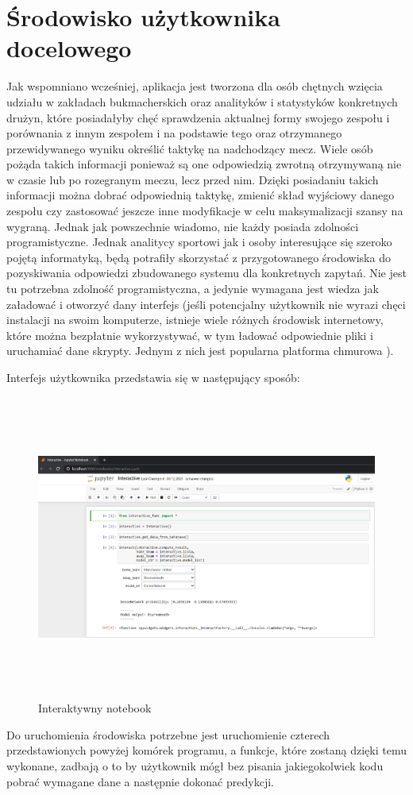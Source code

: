 \section{Środowisko użytkownika docelowego}
\noindent
Jak wspomniano wcześniej, aplikacja jest tworzona dla osób chętnych wzięcia udziału w zakładach bukmacherskich oraz analityków i statystyków konkretnych drużyn, które posiadałyby chęć sprawdzenia aktualnej formy swojego zespołu i porównania z innym zespołem i na podstawie tego oraz otrzymanego przewidywanego wyniku określić taktykę na nadchodzący mecz. Wiele osób pożąda takich informacji ponieważ są one odpowiedzią zwrotną otrzymywaną nie w czasie lub po rozegranym meczu, lecz przed nim. Dzięki posiadaniu takich informacji można dobrać odpowiednią taktykę, zmienić skład wyjściowy danego zespołu czy zastosować jeszcze inne modyfikacje w celu maksymalizacji szansy na wygraną. Jednak jak powszechnie wiadomo, nie każdy posiada zdolności programistyczne. Jednak analitycy sportowi jak i osoby interesujące się szeroko pojętą informatyką, będą potrafiły skorzystać z przygotowanego środowiska do pozyskiwania odpowiedzi zbudowanego systemu dla konkretnych zapytań. Nie jest tu potrzebna zdolność programistyczna, a jedynie wymagana jest wiedza jak załadować i otworzyć dany interfejs (jeśli potencjalny użytkownik nie wyrazi chęci instalacji  na swoim komputerze, istnieje wiele różnych środowisk internetowy, które można bezpłatnie wykorzystywać, w tym ładować odpowiednie pliki i uruchamiać dane skrypty. Jednym z nich jest popularna platforma chmurowa ). 

Interfejs użytkownika przedstawia się w następujący sposób:
\begin{figure}[H] 
        \centering\includegraphics[width=16cm,height=10cm]{figures/Interactive_overview.png}
        \caption{Interaktywny notebook}\label{interactive}
\end{figure}
Do uruchomienia środowiska potrzebne jest uruchomienie czterech przedstawionych powyżej komórek programu, a funkcje, które zostaną dzięki temu wykonane, zadbają o to by użytkownik mógł bez pisania jakiegokolwiek kodu pobrać wymagane dane a następnie dokonać predykcji.

